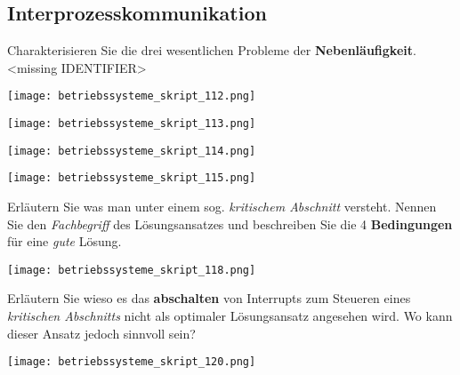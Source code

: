 \documentclass{article}
\begin{document}
\subsection{Interprozesskommunikation}
\begin{tcolorbox}[colback=white!10!white,colframe=lightgray!75!black,
  savelowerto=\jobname_ex.tex,breakable,enhanced,lines before break=40]

\justifying
Charakterisieren Sie die drei wesentlichen Probleme der \textbf{Nebenläufigkeit}.<missing IDENTIFIER>

\tcblower

\justifying
\begin{center}
\texttt{[image: betriebssysteme\_skript\_112.png]}
\end{center}
\begin{center}
\texttt{[image: betriebssysteme\_skript\_113.png]}
\end{center}
\begin{center}
\texttt{[image: betriebssysteme\_skript\_114.png]}
\end{center}
\begin{center}
\texttt{[image: betriebssysteme\_skript\_115.png]}
\end{center}

\end{tcolorbox}
\begin{tcolorbox}[colback=white!10!white,colframe=lightgray!75!black,
  savelowerto=\jobname_ex.tex,breakable,enhanced,lines before break=40]

\justifying
Erläutern Sie was man unter einem sog. \textit{kritischem Abschnitt} versteht. Nennen Sie den \textit{Fachbegriff} des Lösungsansatzes und beschreiben Sie die 4 \textbf{Bedingungen} für eine \textit{gute} Lösung.

\tcblower

\justifying
\begin{center}
\texttt{[image: betriebssysteme\_skript\_118.png]}
\end{center}

\end{tcolorbox}
\begin{tcolorbox}[colback=white!10!white,colframe=lightgray!75!black,
  savelowerto=\jobname_ex.tex,breakable,enhanced,lines before break=40]

\justifying
Erläutern Sie wieso es das \textbf{abschalten} von Interrupts zum Steueren eines \textit{kritischen Abschnitts} nicht als optimaler Lösungsansatz angesehen wird. Wo kann dieser Ansatz jedoch sinnvoll sein?

\tcblower

\justifying
\begin{center}
\texttt{[image: betriebssysteme\_skript\_120.png]}
\end{center}

\end{tcolorbox}
\end{document}
